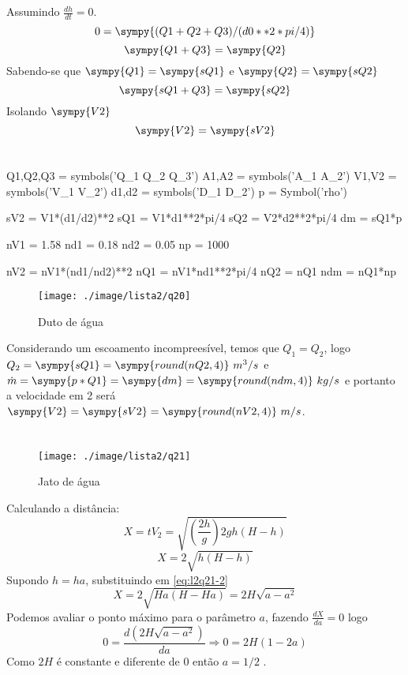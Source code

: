 \documentclass[a4paper,twocolumn,11pt]{article}
\newcommand{\npy}[1]{\sympy{round(n#1,4)}}
\newcommand{\epy}[1]{\sympy{#1} = \sympy{s#1}}
\begin{document}
\subsection{}
Assumindo $\frac{d h}{dt} = 0$.
$$0 = \sympy{(Q1+Q2+Q3)/(d0**2*pi/4)}$$
$$\sympy{Q1+Q3} = \sympy{Q2}$$
Sabendo-se que $\epy{Q1}$ e $\epy{Q2}$
$$\sympy{sQ1+Q3} = \sympy{sQ2}$$
Isolando $\sympy{V2}$
$$\epy{V2}$$

\section{} %
\begin{sympycode}
Q1,Q2,Q3 = symbols('Q_1 Q_2 Q_3')
A1,A2 = symbols('A_1 A_2')
V1,V2 = symbols('V_1 V_2')
d1,d2 = symbols('D_1 D_2')
p = Symbol('rho')

sV2 = V1*(d1/d2)**2
sQ1 = V1*d1**2*pi/4
sQ2 = V2*d2**2*pi/4
dm = sQ1*p

nV1 = 1.58
nd1 = 0.18
nd2 = 0.05
np = 1000

nV2 = nV1*(nd1/nd2)**2
nQ1 = nV1*nd1**2*pi/4
nQ2 = nQ1
ndm = nQ1*np
\end{sympycode}
\begin{figure}[H]
\centering
\label{fig:l2q20}
\texttt{[image: ./image/lista2/q20]}
\caption{Duto de água}
\end{figure}

Considerando um escoamento incompreesível, temos que $Q_1 = Q_2$, logo $Q_2 = \sympy{sQ1} = \npy{Q2}\ m^3/s$ e $\dot{m} = \sympy{p*Q1} = \sympy{dm} = \npy{dm}\ kg/s$ e portanto a velocidade em 2 será $\epy{V2} = \npy{V2}\ m/s$.

\section{} %
\begin{figure}[H]
\centering
\label{fig:l2q21}
\texttt{[image: ./image/lista2/q21]}
\caption{Jato de água}
\end{figure}

Calculando a distância:
$$
X = t V_2 = \sqrt{\left(\frac{2h}{g}\right)2g h(H-h)}
$$
\begin{equation}\label{eq:l2q21-2}
X = 2\sqrt{h(H-h)}
\end{equation}
Supondo $h = h a$, substituindo em \eqref{eq:l2q21-2}
$$
X = 2\sqrt{H a(H-H a)} = 2H\sqrt{a - a^2}
$$
Podemos avaliar o ponto máximo para o parâmetro $a$, fazendo $\frac{d X}{da} = 0$ logo
$$
0 = \frac{d (2H\sqrt{a - a^2})}{da} \Rightarrow 0= 2H (1 - 2a) 
$$
Como $2H$ é constante e diferente de 0 então $a = 1/2$ .
\end{document}
